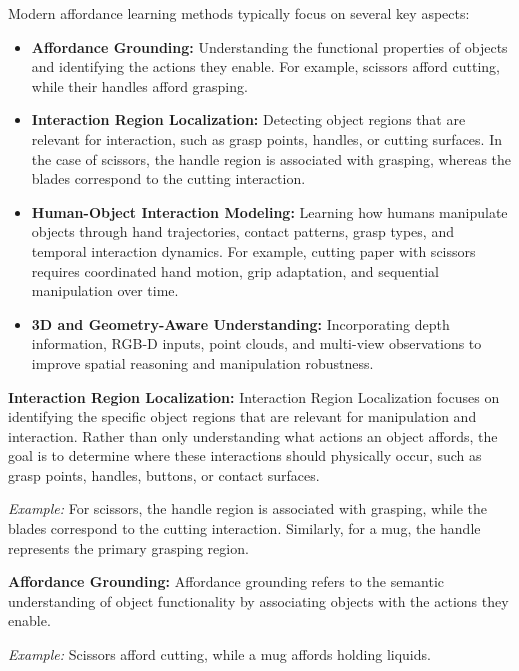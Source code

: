 Modern affordance learning methods typically focus on several key aspects:

\begin{itemize}
    \item \textbf{Affordance Grounding:} Understanding the functional properties of objects and identifying the actions they enable. For example, scissors afford cutting, while their handles afford grasping.
    
    \item \textbf{Interaction Region Localization:} Detecting object regions that are relevant for interaction, such as grasp points, handles, or cutting surfaces. In the case of scissors, the handle region is associated with grasping, whereas the blades correspond to the cutting interaction.
    
    \item \textbf{Human-Object Interaction Modeling:} Learning how humans manipulate objects through hand trajectories, contact patterns, grasp types, and temporal interaction dynamics. For example, cutting paper with scissors requires coordinated hand motion, grip adaptation, and sequential manipulation over time.
    
    \item \textbf{3D and Geometry-Aware Understanding:} Incorporating depth information, RGB-D inputs, point clouds, and multi-view observations to improve spatial reasoning and manipulation robustness.
\end{itemize}


    \item \textbf{Interaction Region Localization:} 
    Interaction Region Localization focuses on identifying the specific object regions that are relevant for manipulation and interaction. Rather than only understanding what actions an object affords, the goal is to determine where these interactions should physically occur, such as grasp points, handles, buttons, or contact surfaces.

    \textit{Example:} For scissors, the handle region is associated with grasping, while the blades correspond to the cutting interaction. Similarly, for a mug, the handle represents the primary grasping region.


        \item \textbf{Affordance Grounding:} 
    Affordance grounding refers to the semantic understanding of object functionality by associating objects with the actions they enable.

    \textit{Example:} Scissors afford cutting, while a mug affords holding liquids.

